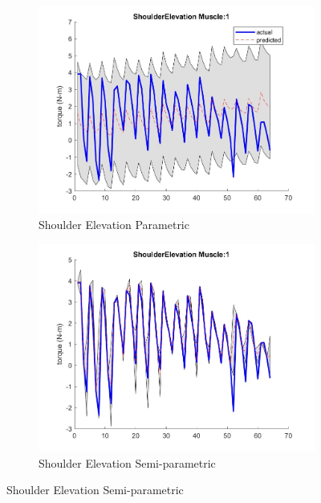 \begin{figure}[htbp]
    \begin{subfigure}[b]{0.45\linewidth}
        \includegraphics[height=0.15\textheight]{Pictures/Results/GPR/ShoulderElevation_1Parametric.jpg}
        \caption{Shoulder Elevation Parametric}
    \end{subfigure}
    \hfill
    \begin{subfigure}[b]{0.45\linewidth}
        \includegraphics[height=0.15\textheight]{Pictures/Results/GPR/ShoulderElevation_1Semiparametric.jpg}
        \caption{Shoulder Elevation Semi-parametric}
    \end{subfigure}
    

\end{figure}
